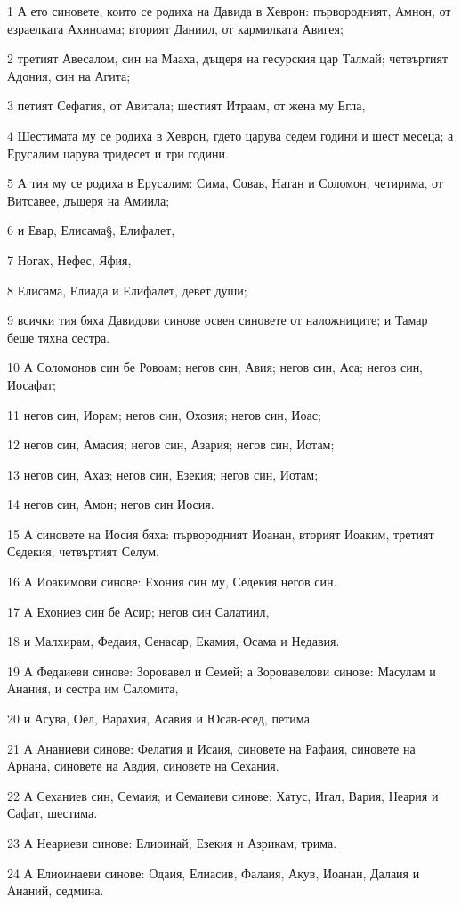 \par 1 А ето синовете, които се родиха на Давида в Хеврон: първородният, Амнон, от езраелката Ахиноама; вторият Даниил, от кармилката Авигея;
\par 2 третият Авесалом, син на Мааха, дъщеря на гесурския цар Талмай; четвъртият Адония, син на Агита;
\par 3 петият Сефатия, от Авитала; шестият Итраам, от жена му Егла,
\par 4 Шестимата му се родиха в Хеврон, гдето царува седем години и шест месеца; а Ерусалим царува тридесет и три години.
\par 5 А тия му се родиха в Ерусалим: Сима, Совав, Натан и Соломон, четирима, от Витсавее, дъщеря на Амиила;
\par 6 и Евар, Елисама§, Елифалет,
\par 7 Ногах, Нефес, Яфия,
\par 8 Елисама, Елиада и Елифалет, девет души;
\par 9 всички тия бяха Давидови синове освен синовете от наложниците; и Тамар беше тяхна сестра.
\par 10 А Соломонов син бе Ровоам; негов син, Авия; негов син, Аса; негов син, Иосафат;
\par 11 негов син, Иорам; негов син, Охозия; негов син, Иоас;
\par 12 негов син, Амасия; негов син, Азария; негов син, Иотам;
\par 13 негов син, Ахаз; негов син, Езекия; негов син, Иотам;
\par 14 негов син, Амон; негов син Иосия.
\par 15 А синовете на Иосия бяха: първородният Иоанан, вторият Иоаким, третият Седекия, четвъртият Селум.
\par 16 А Иоакимови синове: Ехония син му, Седекия негов син.
\par 17 А Ехониев син бе Асир; негов син Салатиил,
\par 18 и Малхирам, Федаия, Сенасар, Екамия, Осама и Недавия.
\par 19 А Федаиеви синове: Зоровавел и Семей; а Зоровавелови синове: Масулам и Анания, и сестра им Саломита,
\par 20 и Асува, Оел, Варахия, Асавия и Юсав-есед, петима.
\par 21 А Ананиеви синове: Фелатия и Исаия, синовете на Рафаия, синовете на Арнана, синовете на Авдия, синовете на Сехания.
\par 22 А Сеханиев син, Семаия; и Семаиеви синове: Хатус, Игал, Вария, Неария и Сафат, шестима.
\par 23 А Неариеви синове: Елиоинай, Езекия и Азрикам, трима.
\par 24 А Елиоинаеви синове: Одаия, Елиасив, Фалаия, Акув, Иоанан, Далаия и Ананий, седмина.

